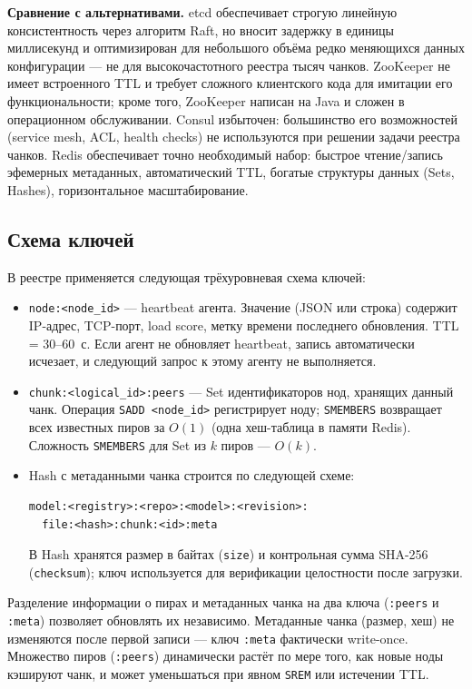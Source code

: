 \textbf{Сравнение с альтернативами.} etcd обеспечивает строгую линейную консистентность через алгоритм Raft, но вносит задержку в единицы миллисекунд и оптимизирован для небольшого объёма редко меняющихся данных конфигурации --- не для высокочастотного реестра тысяч чанков. ZooKeeper не имеет встроенного TTL и требует сложного клиентского кода для имитации его функциональности; кроме того, ZooKeeper написан на Java и сложен в операционном обслуживании. Consul избыточен: большинство его возможностей (service mesh, ACL, health checks) не используются при решении задачи реестра чанков. Redis обеспечивает точно необходимый набор: быстрое чтение/запись эфемерных метаданных, автоматический TTL, богатые структуры данных (Sets, Hashes), горизонтальное масштабирование.

\subsection*{Схема ключей}

В реестре применяется следующая трёхуровневая схема ключей:

\begin{itemize}[leftmargin=*]
  \item \texttt{node:<node\_id>} --- heartbeat агента. Значение (JSON или строка) содержит IP-адрес, TCP-порт, load score, метку времени последнего обновления. TTL = 30--60~с. Если агент не обновляет heartbeat, запись автоматически исчезает, и следующий запрос к этому агенту не выполняется.
  \item \texttt{chunk:<logical\_id>:peers} --- Set идентификаторов нод, хранящих данный чанк. Операция \texttt{SADD <node\_id>} регистрирует ноду; \texttt{SMEMBERS} возвращает всех известных пиров за $O(1)$ (одна хеш-таблица в памяти Redis). Сложность \texttt{SMEMBERS} для Set из $k$ пиров --- $O(k)$.
  \item Hash с метаданными чанка строится по следующей схеме:
\begin{lstlisting}[numbers=none,frame=none,basicstyle=\footnotesize\ttfamily]
model:<registry>:<repo>:<model>:<revision>:
  file:<hash>:chunk:<id>:meta
\end{lstlisting}
  В Hash хранятся размер в байтах (\texttt{size}) и контрольная сумма SHA-256 (\texttt{checksum}); ключ используется для верификации целостности после загрузки.
\end{itemize}

Разделение информации о пирах и метаданных чанка на два ключа (\texttt{:peers} и \texttt{:meta}) позволяет обновлять их независимо. Метаданные чанка (размер, хеш) не изменяются после первой записи --- ключ \texttt{:meta} фактически write-once. Множество пиров (\texttt{:peers}) динамически растёт по мере того, как новые ноды кэшируют чанк, и может уменьшаться при явном \texttt{SREM} или истечении TTL.

